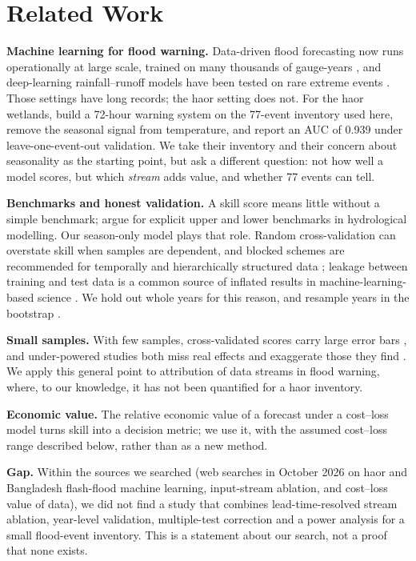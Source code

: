 \section{Related Work}
\textbf{Machine learning for flood warning.} Data-driven flood forecasting now runs operationally at large scale, trained on many thousands of gauge-years \cite{nevo2022,nearing2024}, and deep-learning rainfall--runoff models have been tested on rare extreme events \cite{frame2022}. Those settings have long records; the haor setting does not. For the haor wetlands, \cite{koli2026haorfloodalert} build a 72-hour warning system on the 77-event inventory used here, remove the seasonal signal from temperature, and report an AUC of 0.939 under leave-one-event-out validation. We take their inventory and their concern about seasonality as the starting point, but ask a different question: not how well a model scores, but which \emph{stream} adds value, and whether 77 events can tell.

\textbf{Benchmarks and honest validation.} A skill score means little without a simple benchmark; \cite{seibert2018} argue for explicit upper and lower benchmarks in hydrological modelling. Our season-only model plays that role. Random cross-validation can overstate skill when samples are dependent, and blocked schemes are recommended for temporally and hierarchically structured data \cite{roberts2017}; leakage between training and test data is a common source of inflated results in machine-learning-based science \cite{kapoor2023}. We hold out whole years for this reason, and resample years in the bootstrap \cite{field2007}.

\textbf{Small samples.} With few samples, cross-validated scores carry large error bars \cite{varoquaux2018}, and under-powered studies both miss real effects and exaggerate those they find \cite{button2013}. We apply this general point to attribution of data streams in flood warning, where, to our knowledge, it has not been quantified for a haor inventory.

\textbf{Economic value.} The relative economic value of a forecast under a cost--loss model \cite{richardson2000,wilks2001} turns skill into a decision metric; we use it, with the assumed cost--loss range described below, rather than as a new method.

\textbf{Gap.} Within the sources we searched (web searches in October 2026 on haor and Bangladesh flash-flood machine learning, input-stream ablation, and cost--loss value of data), we did not find a study that combines lead-time-resolved stream ablation, year-level validation, multiple-test correction and a power analysis for a small flood-event inventory. This is a statement about our search, not a proof that none exists.

